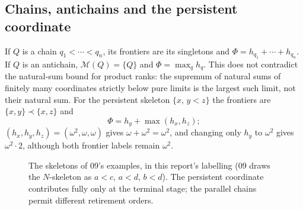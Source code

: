 \documentclass[11pt,a4paper]{article}
\theoremstyle{definition}
\theoremstyle{remark}
\newcommand{\M}{\mathcal M}
\begin{document}
\subsection{Chains, antichains and the persistent coordinate}

If $Q$ is a chain $q_1<\cdots<q_n$, its frontiers are its singletons and
$\Phi=h_{q_1}+\cdots+h_{q_n}$. If $Q$ is an antichain, $\M(Q)=\{Q\}$ and
$\Phi=\max_qh_q$. This does not contradict the natural-sum bound for product
ranks: the supremum of natural sums of finitely many coordinates strictly below
pure limits is the largest such limit, not their natural sum. For the persistent
skeleton $\{x,\,y<z\}$ the frontiers are $\{x,y\}\prec\{x,z\}$ and
\begin{equation}\label{nh:wpo:eq:persistent}
 \Phi=h_y+\max(h_x,h_z);
\end{equation}
$(h_x,h_y,h_z)=(\omega^2,\omega,\omega)$ gives $\omega+\omega^2=\omega^2$, and
changing only $h_y$ to $\omega^2$ gives $\omega^2\cdot2$, although both frontier
labels remain $\omega^2$.

\begin{figure}[htbp]
\centering
{}
\caption{The skeletons of 09's examples, in this report's labelling (09 draws
the $N$-skeleton as $a<c$, $a<d$, $b<d$). The persistent coordinate contributes
fully only at the terminal stage; the parallel chains permit different
retirement orders.}
\label{nh:wpo:fig:examples}
\end{figure}
\end{document}
